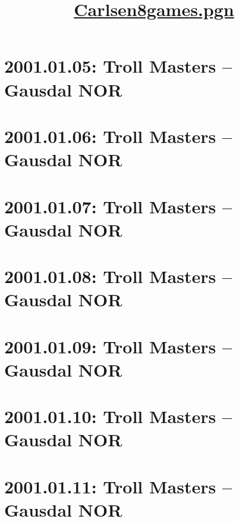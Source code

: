 \documentclass[11pt]{article}
\title{\href{}{Carlsen8games.pgn}}
\begin{document}
\maketitle

\begin{center}
\end{center}

\tableofcontents
\pagebreak[4]

\section{2001.01.05: Troll Masters -- Gausdal NOR}

\pagebreak[4]

\section{2001.01.06: Troll Masters -- Gausdal NOR}

\pagebreak[4]

\section{2001.01.07: Troll Masters -- Gausdal NOR}

\pagebreak[4]

\section{2001.01.08: Troll Masters -- Gausdal NOR}

\pagebreak[4]


\pagebreak[4]

\section{2001.01.09: Troll Masters -- Gausdal NOR}

\pagebreak[4]

\section{2001.01.10: Troll Masters -- Gausdal NOR}

\pagebreak[4]

\section{2001.01.11: Troll Masters -- Gausdal NOR}

\pagebreak[4]
\end{document}
